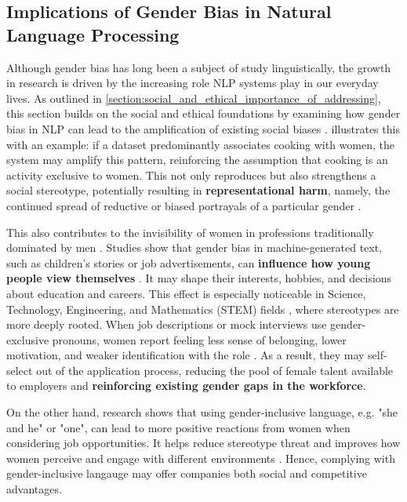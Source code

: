 \subsection{Implications of Gender Bias in Natural Language Processing} \label{subsection:implications_of_gb_in_nlp}
Although gender bias has long been a subject of study linguistically, the growth in research is driven by the increasing role NLP systems play in our everyday lives. As outlined in \autoref{section:social_and_ethical_importance_of_addressing}, this section builds on the social and ethical foundations by examining how gender bias in NLP can lead to the amplification of existing social biases \citep{rescignoGenderBiasMachine2023}.
\citet{ullmannGenderBiasMachine2022} illustrates this with an example: if a dataset predominantly associates cooking with women, the system may amplify this pattern, reinforcing the assumption that cooking is an activity exclusive to women. This not only reproduces but also strengthens a social stereotype, potentially resulting in \textbf{representational harm}, namely, the continued spread of reductive or biased portrayals of a particular gender \citep{stanczakSurveyGenderBias2021}. 

This also contributes to the invisibility of women in professions traditionally dominated by men \citep{kapplAreAllSpanish2025}. Studies show that gender bias in machine-generated text, such as children's stories or job advertisements, can \textbf{influence how young people view themselves} \citep{soundararajanInvestigatingGenderBias2024,kapplAreAllSpanish2025}. It may shape their interests, hobbies, and decisions about education and careers. This effect is especially noticeable in Science, Technology, Engineering, and Mathematics (STEM) fields \citep{pratesAssessingGenderBias2019}, where stereotypes are more deeply rooted. When job descriptions or mock interviews use gender-exclusive pronouns, women report feeling less sense of belonging, lower motivation, and weaker identification with the role \citep{godsilEffectsGenderRoles2016}. As a result, they may self-select out of the application process, reducing the pool of female talent available to employers and \textbf{reinforcing existing gender gaps in the workforce}.

On the other hand, research shows that using gender-inclusive language, e.g. "she and he" or "one", can lead to more positive reactions from women when considering job opportunities. It helps reduce stereotype threat and improves how women perceive and engage with different environments \citep{ godsilEffectsGenderRoles2016}. Hence, complying with gender-inclusive langauge may offer companies both social and competitive advantages.


